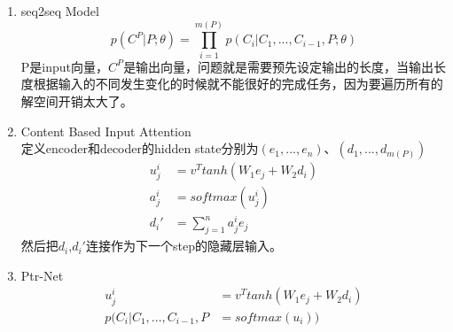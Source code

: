 \documentclass[a4paper,UTF8]{article}
\numberwithin{equation}{section}
\begin{document}
\begin{enumerate}
	\item seq2seq Model\\$$p(C^P|P;\theta)=\prod_{i=1}^{m(P)}p(C_i|C_1,...,C_{i-1},P;\theta)$$
	P是input向量，$C^P$是输出向量，问题就是需要预先设定输出的长度，当输出长度根据输入的不同发生变化的时候就不能很好的完成任务，因为要遍历所有的解空间开销太大了。
	\item Content Based Input Attention\\定义encoder和decoder的hidden state分别为$(e_1,...,e_n)$、$(d_1,...,d_{m(P)})$
	\begin{align*}
		u_j^i&=v^T tanh(W_1e_j+W_2d_i) \\ 
		a_j^i&=softmax(u_j^i) \\ 
		d_i'&=\sum_{j=1}^{n}a_j^ie_j 
	\end{align*}
	然后把$d_i$,$d_i'$连接作为下一个step的隐藏层输入。
	\item Ptr-Net\\
	\begin{align*}
		u_j^i&=v^T tanh(W_1e_j+W_2d_i) \\ 
		p(C_i|C_1,...,C_{i-1},P&=softmax(u_i))
	\end{align*}
	
\end{enumerate}


\newpage
\end{document}
